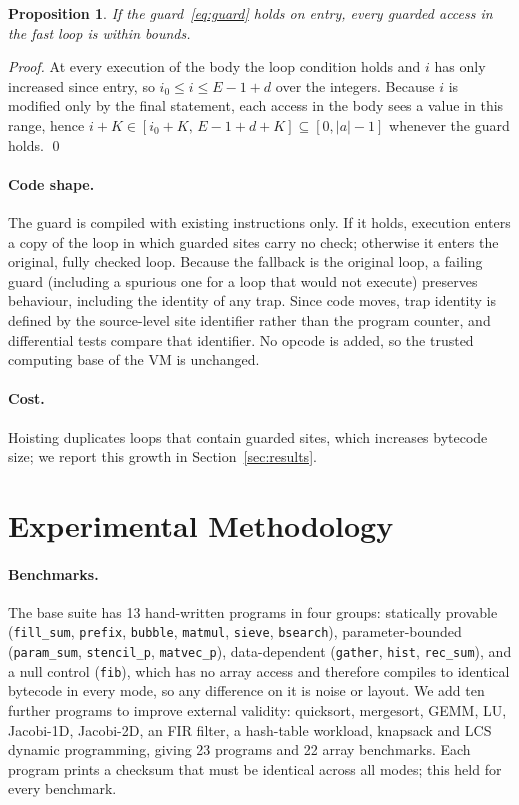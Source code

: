 \documentclass[11pt,a4paper]{article}
\newtheorem{proposition}{Proposition}
\begin{document}
\begin{proposition}
If the guard~\eqref{eq:guard} holds on entry, every guarded access in the fast loop is within bounds.
\end{proposition}
\begin{proof}
At every execution of the body the loop condition holds and $i$ has only increased since entry, so $i_0\le i\le E-1+d$ over the integers. Because $i$ is modified only by the final statement, each access in the body sees a value in this range, hence $i+K\in[i_0+K,\,E-1+d+K]\subseteq[0,|a|-1]$ whenever the guard holds. \qed
\end{proof}

\paragraph{Code shape.} The guard is compiled with existing instructions only. If it holds, execution enters a copy of the loop in which guarded sites carry no check; otherwise it enters the original, fully checked loop. Because the fallback is the original loop, a failing guard (including a spurious one for a loop that would not execute) preserves behaviour, including the identity of any trap. Since code moves, trap identity is defined by the source-level site identifier rather than the program counter, and differential tests compare that identifier. No opcode is added, so the trusted computing base of the VM is unchanged.

\paragraph{Cost.} Hoisting duplicates loops that contain guarded sites, which increases bytecode size; we report this growth in Section~\ref{sec:results}.

\section{Experimental Methodology}\label{sec:method}
\paragraph{Benchmarks.} The base suite has 13 hand-written programs in four groups: statically provable (\texttt{fill\_sum}, \texttt{prefix}, \texttt{bubble}, \texttt{matmul}, \texttt{sieve}, \texttt{bsearch}), parameter-bounded (\texttt{param\_sum}, \texttt{stencil\_p}, \texttt{matvec\_p}), data-dependent (\texttt{gather}, \texttt{hist}, \texttt{rec\_sum}), and a null control (\texttt{fib}), which has no array access and therefore compiles to identical bytecode in every mode, so any difference on it is noise or layout. We add ten further programs to improve external validity: quicksort, mergesort, GEMM, LU, Jacobi-1D, Jacobi-2D, an FIR filter, a hash-table workload, knapsack and LCS dynamic programming, giving 23 programs and 22 array benchmarks. Each program prints a checksum that must be identical across all modes; this held for every benchmark.
\end{document}
